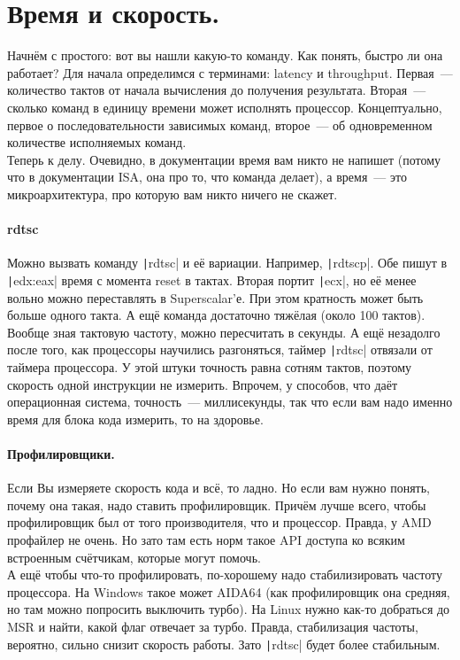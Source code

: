 \documentclass{article}
\begin{document}
    \section{Время и скорость.}
    Начнём с простого: вот вы нашли какую-то команду. Как понять, быстро ли она работает? Для начала определимся с терминами: latency и throughput. Первая~--- количество тактов от начала вычисления до получения результата. Вторая~--- сколько команд в единицу времени может исполнять процессор. Концептуально, первое о последовательности зависимых команд, второе~--- об одновременном количестве исполняемых команд.\\
    Теперь к делу. Очевидно, в документации время вам никто не напишет (потому что в документации ISA, она про то, что команда делает), а время~--- это микроархитектура, про которую вам никто ничего не скажет.
    \paragraph{rdtsc}
    Можно вызвать команду \texttt|rdtsc| и её вариации. Например, \texttt|rdtscp|. Обе пишут в \texttt|edx:eax| время с момента reset в тактах. Вторая портит \texttt|ecx|, но её менее вольно можно переставлять в Superscalar'е. При этом кратность может быть больше одного такта. А ещё команда достаточно тяжёлая (около 100 тактов). Вообще зная тактовую частоту, можно пересчитать в секунды. А ещё незадолго после того, как процессоры научились разгоняться, таймер \texttt|rdtsc| отвязали от таймера процессора. У этой штуки точность равна сотням тактов, поэтому скорость одной инструкции не измерить. Впрочем, у способов, что даёт операционная система, точность~--- миллисекунды, так что если вам надо именно время для блока кода измерить, то на здоровье.
    \paragraph{Профилировщики.}
    Если Вы измеряете скорость кода и всё, то ладно. Но если вам нужно понять, почему она такая, надо ставить профилировщик. Причём лучше всего, чтобы профилировщик был от того производителя, что и процессор. Правда, у AMD профайлер не очень. Но зато там есть норм такое API доступа ко всяким встроенным счётчикам, которые могут помочь.\\
    А ещё чтобы что-то профилировать, по-хорошему надо стабилизировать частоту процессора. На Windows такое может AIDA64 (как профилировщик она средняя, но там можно попросить выключить турбо). На Linux нужно как-то добраться до MSR и найти, какой флаг отвечает за турбо. Правда, стабилизация частоты, вероятно, сильно снизит скорость работы. Зато \texttt|rdtsc| будет более стабильным.
\end{document}
